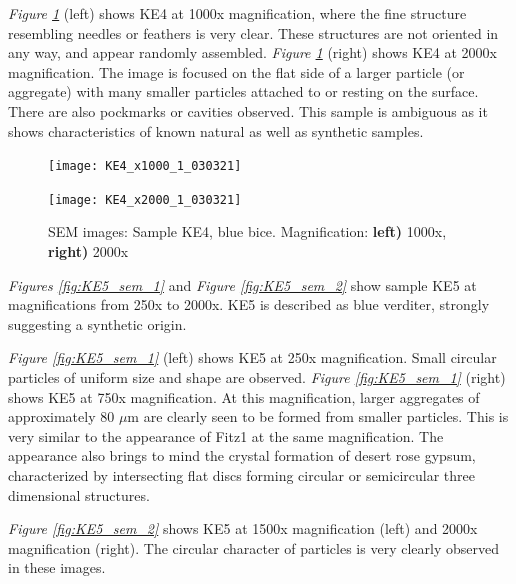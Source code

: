 \textit{Figure \ref{fig:KE4_sem_2}} (left) shows KE4 at 1000x magnification, where the fine structure resembling needles or feathers is very clear. These structures are not oriented in any way, and appear randomly assembled. \textit{Figure \ref{fig:KE4_sem_2}} (right) shows KE4 at 2000x magnification. The image is focused on the flat side of a larger particle (or aggregate) with many smaller particles attached to or resting on the surface. There are also pockmarks or cavities observed. This sample is ambiguous as it shows characteristics of known natural as well as synthetic samples.

\begin{figure}[H]
\centering
\begin{minipage}{.45\textwidth}
  \centering
  \texttt{[image: KE4\_x1000\_1\_030321]}
\end{minipage}
\begin{minipage}{.45\textwidth}
  \centering
  \texttt{[image: KE4\_x2000\_1\_030321]}
\end{minipage}
\caption[SEM images: Sample KE4, blue bice]{SEM images: Sample KE4, blue bice. Magnification: \textbf{left)} 1000x, \textbf{right)} 2000x}
\label{fig:KE4_sem_2}
\end{figure}


\textit{Figures \ref{fig:KE5_sem_1}} and \textit{Figure \ref{fig:KE5_sem_2}} show sample KE5 at magnifications from 250x to 2000x. KE5 is described as blue verditer, strongly suggesting a synthetic origin.

\textit{Figure \ref{fig:KE5_sem_1}} (left) shows KE5 at 250x magnification. Small circular particles of uniform size and shape are observed. \textit{Figure \ref{fig:KE5_sem_1}} (right) shows KE5 at 750x magnification. At this magnification, larger aggregates of approximately 80 $\mu$m are clearly seen to be formed from smaller particles. This is very similar to the appearance of Fitz1 at the same magnification. The appearance also brings to mind the crystal formation of desert rose gypsum, characterized by intersecting flat discs forming circular or semicircular three dimensional structures.%

\textit{Figure \ref{fig:KE5_sem_2}} shows KE5 at 1500x magnification (left) and 2000x magnification (right). The circular character of particles is very clearly observed in these images.


